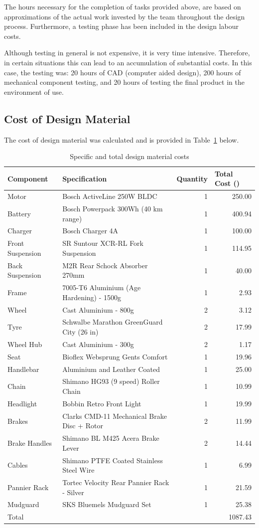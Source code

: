 \documentclass[a4paper,11pt]{article}
\begin{document}
The hours necessary for the completion of tasks provided above, are based on approximations of the actual work invested by the team throughout the design process. Furthermore, a testing phase has been included in the design labour costs. 

Although testing in general is not expensive, it is very time intensive. Therefore, in certain situations this can lead to an accumulation of substantial costs. In this case, the testing was: 20 hours of CAD (computer aided design), 200 hours of mechanical component testing, and 20 hours of testing the final product in the environment of use. 

\subsection{Cost of Design Material}

The cost of design material was calculated and is provided in Table~\ref{tab:desmat} below. 

\begin{table}[!ht]
	\centering
	\caption{Specific and total design material costs}
	\begin{tabular}{l l r r}
		\hline
		\multicolumn{1}{l}{Component}&\multicolumn{1}{l}{Specification}&\multicolumn{1}{l}{Quantity}&\multicolumn{1}{l}{Total Cost (\textsterling)}\\\hline
		Motor&Bosch ActiveLine 250W BLDC&1&250.00\\
		Battery&Bosch Powerpack 300Wh (40 km range)&1&400.94\\
		Charger&Bosch Charger 4A&1&100.00\\
		Front Suspension&SR Suntour XCR-RL Fork Suspension&1&114.95\\
		Back Suspension&M2R Rear Schock Absorber 270mm&1&40.00\\
		Frame&7005-T6 Aluminium (Age Hardening) - 1500g&1&2.93\\
		Wheel&Cast Aluminium - 800g&2&3.12\\
		Tyre&Schwalbe Marathon GreenGuard City (26 in)&2&17.99\\
		Wheel Hub&Cast Aluminium - 300g&2&1.17\\
		Seat&Bioflex Websprung Gents Comfort&1&19.96\\
		Handlebar&Aluminium and Leather Coated&1&25.00\\
		Chain&Shimano HG93 (9 speed) Roller Chain&1&10.99\\
		Headlight&Bobbin Retro Front Light&1&19.99\\
		Brakes&Clarks CMD-11 Mechanical Brake Disc + Rotor&2&11.99\\
		Brake Handles&Shimano BL M425 Acera Brake Lever&2&14.44\\
		Cables&Shimano PTFE Coated Stainless Steel Wire&1&6.99\\
		Pannier Rack&Tortec Velocity Rear Pannier Rack - Silver&1&21.59\\
		Mudguard&SKS Bluemels Mudguard Set&1&25.38\\\hline
		Total&&&1087.43\\\hline
	\end{tabular}
	\label{tab:desmat}
\end{table}
\end{document}

